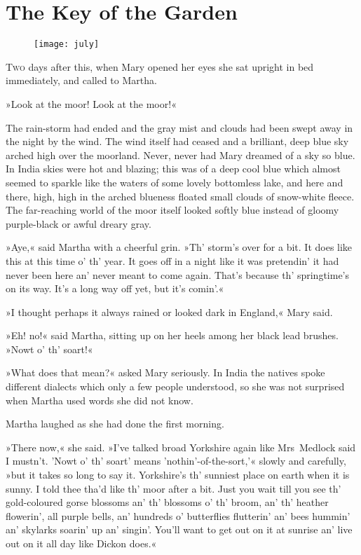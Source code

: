 \chapter{The Key of the Garden} 
	
\begin{figure}[t!]
\centering
\texttt{[image: july]}
\end{figure}

 \lettrine[lines=6]{T}{wo} days after this, when Mary opened her eyes she sat upright in bed immediately, and called to Martha.

\zz
»Look at the moor! Look at the moor!«

\zz
The rain-storm had ended and the gray mist and clouds had been swept away in the night by the wind. The wind itself had ceased and a brilliant, deep blue sky arched high over the moorland. Never, never had Mary dreamed of a sky so blue. In India skies were hot and blazing; this was of a deep cool blue which almost seemed to sparkle like the waters of some lovely bottomless lake, and here and there, high, high in the arched blueness floated small clouds of snow-white fleece. The far-reaching world of the moor itself looked softly blue instead of gloomy purple-black or awful dreary gray.

»Aye,« said Martha with a cheerful grin. »Th' storm's over for a bit. It does like this at this time o' th' year. It goes off in a night like it was pretendin' it had never been here an' never meant to come again. That's because th' springtime's on its way. It's a long way off yet, but it's comin'.«

»I thought perhaps it always rained or looked dark in England,« Mary said.

»Eh! no!« said Martha, sitting up on her heels among her black lead brushes. »Nowt o' th' soart!«

»What does that mean?« asked Mary seriously. In India the natives spoke different dialects which only a few people understood, so she was not surprised when Martha used words she did not know.

Martha laughed as she had done the first morning.

»There now,« she said. »I've talked broad Yorkshire again like Mrs~Medlock said I mustn't. 'Nowt o' th' soart' means 'nothin'-of-the-sort,'« slowly and carefully, »but it takes so long to say it. Yorkshire's th' sunniest place on earth when it is sunny. I told thee tha'd like th' moor after a bit. Just you wait till you see th' gold-coloured gorse blossoms an' th' blossoms o' th' broom, an' th' heather flowerin', all purple bells, an' hundreds o' butterflies flutterin' an' bees hummin' an' skylarks soarin' up an' singin'. You'll want to get out on it at sunrise an' live out on it all day like Dickon does.«

